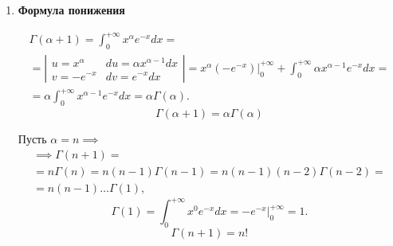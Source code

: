 \begin{enumerate}
\begin{proof}
            Так как $ \int_{0}^{+\infty}x^{\alpha_0 - \epsilon -1}\cdot x^{\frac{\alpha_0 - \epsilon - 1}{x}}dx $ сходится по признаку Вейерштрасса, то $ \int_{0}^{+\infty}x^{\alpha-1}e^{-x}\ln x dx $ сходится равномерно на $ [\alpha_0 - \epsilon;\alpha_0+\epsilon] $.

            Далее, $ \forall\alpha \in [\alpha_0 - \epsilon;\alpha_0 + \epsilon] $
            \[
                e^{-x}x^{\alpha-1}\ln x \leqslant e^{-x}x^{\alpha_0+\epsilon-1}\ln x.
            \]

            Так как $ \int_{0}^{+\infty}e^{-x}x^{\alpha_0+\epsilon-1}\ln x dx $ сходится, то и сходится равномерно на $ [\alpha_0-\epsilon;\alpha_0+\epsilon] $ и $ \int_{0}^{+\infty}e^{-x}x^{\alpha-1}\ln x dx $.

            Аналогичное доказательство имеет место быть и для $ \Gamma^{(n)}(\alpha) $.
        \end{proof}

    \item \textbf{Формула понижения}

          \begin{note}
              \begin{multline*}
                  \Gamma(\alpha+1) = \int_{0}^{+\infty}x^\alpha e^{-x}dx = \\
                  = \left|\begin{array}{ll}
                      u = x^\alpha & du = \alpha x^{\alpha-1}dx \\
                      v = -e^{-x}  & dv = e^{-x}dx
                  \end{array}\right| = x^\alpha(-e^{-x})\Big|_0^{+\infty} + \int_{0}^{+\infty}\alpha x^{\alpha-1}e^{-x}dx = \\
                  = \alpha \int_{0}^{+\infty}x^{\alpha-1}e^{-x}dx = \alpha \Gamma(\alpha).
              \end{multline*}
              \[
                  \boxed{\Gamma(\alpha+1) = \alpha\Gamma(\alpha)}
              \]

              Пусть $ \alpha=n \implies $
              \begin{multline*}
                  \implies \Gamma(n+1) = \\
                  = n\Gamma(n) = n(n-1)\Gamma(n-1) = n(n-1)(n-2)\Gamma(n-2) = \\
                  = n(n-1)\ldots\Gamma(1),
              \end{multline*}
              \[
                  \Gamma(1) = \int_{0}^{+\infty}x^0 e^{-x}dx = -e^{-x}\Big|_0^{+\infty} = 1.
              \]
              \[
                  \boxed{\Gamma(n+1) = n!}
              \]
          \end{note}
\end{enumerate}